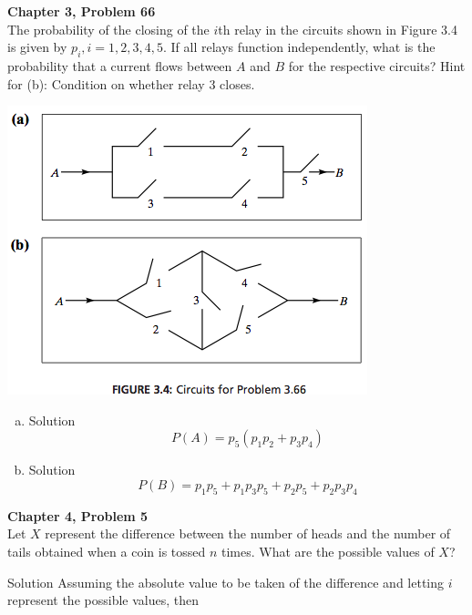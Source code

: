 \documentclass{article}
\begin{document}
\begin{spacing}{1.1}
\maketitle

\newpage
\begin{homeworkProblem}
{\bf Chapter 3, Problem 66}\\
  The probability of the closing of the $i$th relay in the circuits 
  shown in Figure 3.4 is given by $p_i, i = 1, 2, 3, 4, 5$. If all 
  relays function independently, what is the probability that a 
  current flows between $A$ and $B$ for the respective circuits?
  Hint for (b): Condition on whether relay 3 closes.

  \includegraphics{p108_66}
  \begin{enumerate}[(a)]
    \item
      \begin{homeworkSection}{Solution}
        \[P(A) = p_5 (p_1 p_2 + p_3 p_4)\]
      \end{homeworkSection}
    \item
      \begin{homeworkSection}{Solution}
        \[P(B) = p_1 p_5 + p_1 p_3 p_5 + p_2 p_5 + p_2 p_3 p_4\]
      \end{homeworkSection}
  \end{enumerate}
\end{homeworkProblem}

\newpage
\begin{homeworkProblem}
  {\bf Chapter 4, Problem 5}\\
  Let $X$ represent the difference between the number of heads
  and the number of tails obtained when a coin is tossed $n$ times. 
  What are the possible values of $X$?
  \begin{homeworkSection}{Solution}
    Assuming the absolute value to be taken of the difference and
    letting $i$ represent the possible values, then 


\end{homeworkSection}
\end{homeworkProblem}
\end{spacing}
\end{document}
